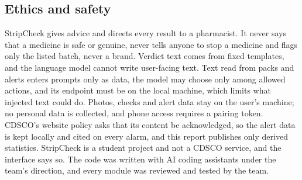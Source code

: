 \subsection{Ethics and safety}
StripCheck gives advice and directs every result to a pharmacist. It never says that a medicine is safe or genuine, never tells anyone to stop a medicine and flags only the listed batch, never a brand. Verdict text comes from fixed templates, and the language model cannot write user-facing text. Text read from packs and alerts enters prompts only as data, the model may choose only among allowed actions, and its endpoint must be on the local machine, which limits what injected text could do. Photos, checks and alert data stay on the user's machine; no personal data is collected, and phone access requires a pairing token. CDSCO's website policy asks that its content be acknowledged, so the alert data is kept locally and cited on every alarm, and this report publishes only derived statistics. StripCheck is a student project and not a CDSCO service, and the interface says so. The code was written with AI coding assistants under the team's direction, and every module was reviewed and tested by the team.

